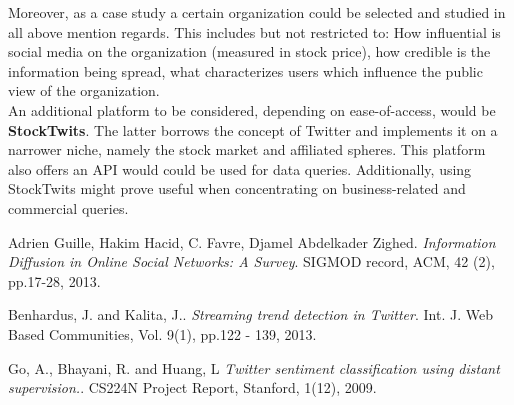 \documentclass[12pt]{article}
\begin{document}
Moreover, as a case study a certain organization could be selected and studied in all above mention regards. This includes but not restricted to: How influential is social media on the organization (measured in stock price), how credible is the information being spread, what characterizes users which influence the public view of the organization.
\\

An additional platform to be considered, depending on ease-of-access, would be \textbf{StockTwits}. The latter borrows the concept of Twitter and implements it on a narrower niche, namely the stock market and affiliated spheres. This platform also offers an API would could be used for data queries. Additionally, using StockTwits might prove useful when concentrating on business-related and commercial queries.


\medskip
 
\begin{thebibliography}{9}

Adrien Guille, Hakim Hacid, C. Favre, Djamel Abdelkader Zighed. 
\textit{Information Diffusion in Online Social Networks: A Survey}. 
SIGMOD record, ACM, 42 (2), pp.17-28, 2013.
 
Benhardus, J. and Kalita, J.. 
\textit{Streaming trend detection in Twitter}.
Int. J. Web Based Communities, Vol. 9(1), pp.122 - 139, 2013.
 
Go, A., Bhayani, R. and Huang, L
\textit{Twitter sentiment classification using distant supervision.}.
CS224N Project Report, Stanford, 1(12), 2009.

\end{thebibliography}
\end{document}
